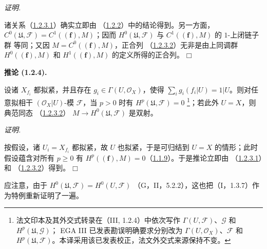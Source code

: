\documentclass[UTF8,fontset=none,11pt,oneside,openany]{ctexbook}
\providecommand{\square}{\mdlgwhtsquare}
\newcommand{\SourceCorrectionNote}[1]{\footnote{#1}}
\newenvironment{corollary}[1][]{%
  \par\medskip\noindent\textbf{推论 (#1).}\ %
}{\par}
\newenvironment{proof}{%
  \par\smallskip\noindent\textit{证明.}\ %
}{\hfill$\square$\par}
\newcommand{\oldpage}[2][]{%
  \hypertarget{ega-source-page-#1-#2}{}%
  \marginnote{\scriptsize\textbf{#1}~|~#2}\ignorespaces}
\let\EGAOriginalLabel\label
\renewcommand{\label}[1]{\phantomsection\EGAOriginalLabel{#1}}
\begin{document}
\oldpage[III]{87}
\begin{proof}
诸关系（\hyperref[III.1.2.3.1-fr]{1.2.3.1}）确实立即由
（\hyperref[III.1.2.2-fr]{1.2.2}）中的结论得到。另一方面，
$C^0(\mathfrak U,\mathcal F)=C^1((\mathbf f),M)$；因而
$H^0(\mathfrak U,\mathcal F)$ 与 $C^1((\mathbf f),M)$ 的 $1$-上闭链子群
等同；又因 $M=C^0((\mathbf f),M)$，正合列
（\hyperref[III.1.2.3.2-fr]{1.2.3.2}）无非是由上同调群
$H^0((\mathbf f),M)$ 和 $H^1((\mathbf f),M)$ 的定义所得的正合列。
\end{proof}

\begin{corollary}[1.2.4]
\label{III.1.2.4-fr}
设诸 $X_{f_i}$ 都拟紧，并且存在 $g_i\in\Gamma(U,\mathcal O_X)$，使得
$\sum_i g_i(f_i\vert U)=1\vert U$。则对任意拟相干
$(\mathcal O_X\vert U)$-模 $\mathcal F$，当 $p>0$ 时有
$H^p(\mathfrak U,\mathcal F)=0$
\SourceCorrectionNote{法文印本及其外交式转录在（III, 1.2.4）中依次写作
$\Gamma(U,\mathcal F)$、$\mathcal G$ 和 $H^p(\mathfrak U,\mathcal G)$；
EGA III 已发表勘误明确要求分别改为 $\Gamma(U,\mathcal O_X)$、$\mathcal F$
和 $H^p(\mathfrak U,\mathcal F)$。本译采用该已发表校正，法文外交式来源保持不变。}；若此外 $U=X$，则典范同态
（\hyperref[III.1.2.3.2-fr]{1.2.3.2}）
$M\to H^0(\mathfrak U,\mathcal F)$ 是双射。
\end{corollary}

\begin{proof}
按假设，诸 $U_i=X_{f_i}$ 都拟紧，故 $U$ 也拟紧，于是可归结到 $U=X$
的情形；此时假设蕴含对所有 $p\geq0$ 有
$H^p((\mathbf f),M)=0$（\hyperref[III.1.1.9-fr]{1.1.9}）。于是推论立即由
（\hyperref[III.1.2.3.1-fr]{1.2.3.1}）和
（\hyperref[III.1.2.3.2-fr]{1.2.3.2}）得到。
\end{proof}

应注意，由于 $H^0(\mathfrak U,\mathcal F)=H^0(U,\mathcal F)$
（G，II，5.2.2），这也把（I，1.3.7）作为特例重新证明了一遍。
\end{document}
